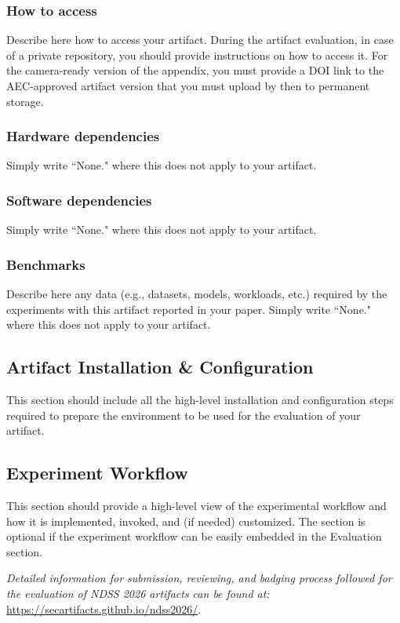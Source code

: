 \documentclass[conference]{IEEEtran}
\begin{document}
\subsubsection{How to access}
Describe here how to access your artifact. During the artifact evaluation, in case of a private repository, you should provide instructions on how to access it. For the camera-ready version of the appendix, you must provide a DOI link to the AEC-approved artifact version that you must upload by then to permanent storage.

\subsubsection{Hardware dependencies}
Simply write ``None." where this does not apply to your artifact.

\subsubsection{Software dependencies}
Simply write ``None." where this does not apply to your artifact.

\subsubsection{Benchmarks}
Describe here any data (e.g., datasets, models, workloads, etc.) required by the experiments with this artifact reported in your paper. Simply write ``None." where this does not apply to your artifact.


\subsection{Artifact Installation \& Configuration}

This section should include all the high-level installation and configuration steps required to prepare the environment to be used for the evaluation of your artifact.

\subsection{Experiment Workflow}

This section should provide a high-level view of the experimental workflow and how it is implemented, invoked, and (if needed) customized. The section is optional if the experiment workflow can be easily embedded in the Evaluation section.

\textit{Detailed information for submission, reviewing, and badging process followed for the evaluation of NDSS 2026 artifacts can be found at:} \url{https://secartifacts.github.io/ndss2026/}.
\end{document}
